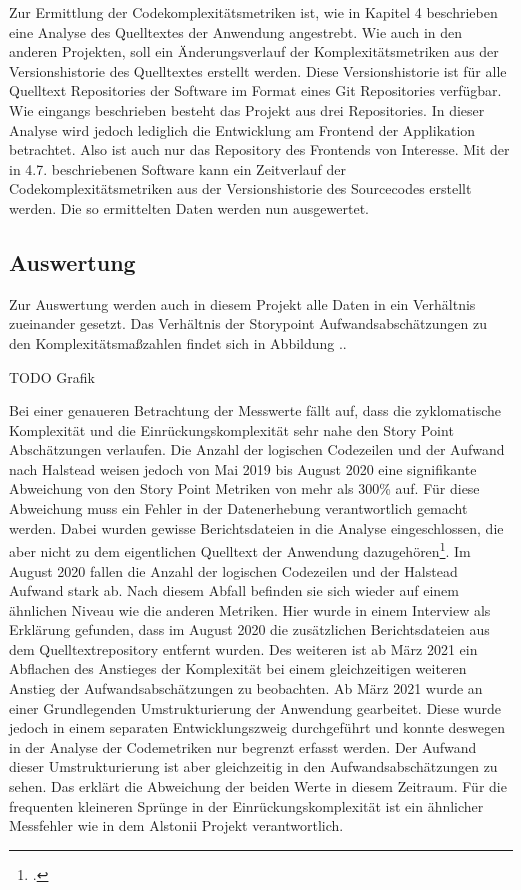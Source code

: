 Zur Ermittlung der Codekomplexitätsmetriken ist, wie in Kapitel 4
beschrieben eine Analyse des Quelltextes der Anwendung angestrebt. Wie
auch in den anderen Projekten, soll ein Änderungsverlauf der
Komplexitätsmetriken aus der Versionshistorie des Quelltextes erstellt
werden. Diese Versionshistorie ist für alle Quelltext Repositories der
Software im Format eines Git Repositories verfügbar. Wie eingangs
beschrieben besteht das Projekt aus drei Repositories. In dieser Analyse
wird jedoch lediglich die Entwicklung am Frontend der Applikation
betrachtet. Also ist auch nur das Repository des Frontends von
Interesse. Mit der in 4.7. beschriebenen Software kann ein Zeitverlauf
der Codekomplexitätsmetriken aus der Versionshistorie des Sourcecodes
erstellt werden. Die so ermittelten Daten werden nun ausgewertet.

\subsection{Auswertung}\label{engelmannii-Auswertung}

Zur Auswertung werden auch in diesem Projekt alle Daten in ein
Verhältnis zueinander gesetzt. Das Verhältnis der Storypoint
Aufwandsabschätzungen zu den Komplexitätsmaßzahlen findet sich in
Abbildung ..

TODO Grafik

Bei einer genaueren Betrachtung der Messwerte fällt auf, dass die
zyklomatische Komplexität und die Einrückungskomplexität sehr nahe den
Story Point Abschätzungen verlaufen. Die Anzahl der logischen Codezeilen
und der Aufwand nach Halstead weisen jedoch von Mai 2019 bis August 2020
eine signifikante Abweichung von den Story Point Metriken von mehr als
300\% auf. Für diese Abweichung muss ein Fehler in der Datenerhebung
verantwortlich gemacht werden. Dabei wurden gewisse Berichtsdateien in
die Analyse eingeschlossen, die aber nicht zu dem eigentlichen Quelltext
der Anwendung dazugehören\footcite[Vgl. ][]{Quelle Interview}. Im August 2020
fallen die Anzahl der logischen Codezeilen und der Halstead Aufwand
stark ab. Nach diesem Abfall befinden sie sich wieder auf einem
ähnlichen Niveau wie die anderen Metriken. Hier wurde in einem Interview
als Erklärung gefunden, dass im August 2020 die zusätzlichen
Berichtsdateien aus dem Quelltextrepository entfernt wurden. Des
weiteren ist ab März 2021 ein Abflachen des Anstieges der Komplexität
bei einem gleichzeitigen weiteren Anstieg der Aufwandsabschätzungen zu
beobachten. Ab März 2021 wurde an einer Grundlegenden Umstrukturierung
der Anwendung gearbeitet. Diese wurde jedoch in einem separaten
Entwicklungszweig durchgeführt und konnte deswegen in der Analyse der
Codemetriken nur begrenzt erfasst werden. Der Aufwand dieser
Umstrukturierung ist aber gleichzeitig in den Aufwandsabschätzungen zu
sehen. Das erklärt die Abweichung der beiden Werte in diesem Zeitraum.
Für die frequenten kleineren Sprünge in der Einrückungskomplexität ist
ein ähnlicher Messfehler wie in dem Alstonii Projekt verantwortlich.

